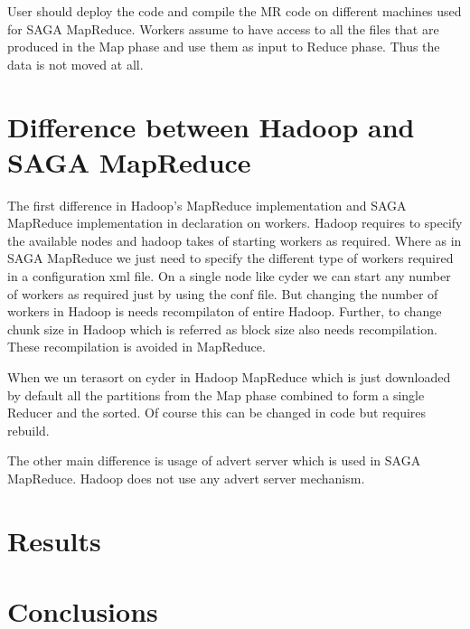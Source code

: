 \documentclass[12pt]{article}
\begin{document}
User should deploy the code and compile the MR code on different machines used for SAGA MapReduce. Workers assume to have access to all the files that are produced in the Map phase and use them as input to Reduce phase. Thus the data is not moved at all.


\section{Difference between Hadoop and SAGA MapReduce}

The first difference in Hadoop's MapReduce implementation and SAGA MapReduce implementation in declaration on workers. Hadoop requires to specify the available nodes and hadoop takes of starting workers as required. Where as in SAGA MapReduce we just need to specify the different type of workers required in a configuration xml file. On  a single node like cyder we can start any number of workers as required just by using the conf file. But changing the number of workers in Hadoop is needs recompilaton of entire Hadoop. Further, to change chunk size in Hadoop which is referred as block size also needs recompilation. These recompilation is avoided in MapReduce. 

When we un terasort on cyder in Hadoop MapReduce which is just downloaded by default all the partitions from the Map phase combined to form a single Reducer and the sorted. Of course this can be changed in code but requires rebuild.

The other main difference is usage of advert server which is used in SAGA MapReduce. Hadoop does not use any advert server mechanism.
\section{Results}\label{results}


\section{Conclusions}\label{conclusions}




\end{document}
